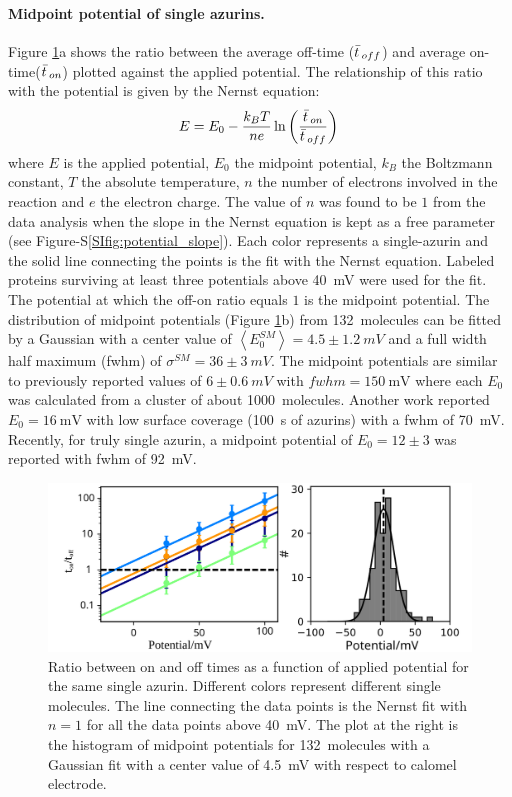 \paragraph*{Midpoint potential of single azurins.}
Figure \ref{fig:midpoint}a shows the ratio between the average off-time ($\bar{t}\,_{off}$) and average on-time($\bar{t}\,_{on}$) plotted against the applied potential.
The relationship of this ratio with the potential is given by the Nernst equation: 
\begin{equation}
	E = E_0 - \frac{k_BT}{n e}\ln\left(\frac{\bar{t}\,_{on}}{\bar{t}\,_{off}}\right)\,
	\label{eq:nernst}
\end{equation}
where $E$ is the applied potential, $E_0$ the midpoint potential, $k_B$ the Boltzmann constant, $T$ the absolute temperature, $n$ the number of electrons involved in the reaction and $e$ the electron charge.
The value of $n$ was found to be $1$ from the data analysis when the slope in the Nernst equation is kept as a free parameter (see Figure-S\ref{SIfig:potential_slope}).
Each color represents a single-azurin and the solid line connecting the points is the fit with the Nernst equation.
Labeled proteins surviving at least three potentials above \SI{40}{\mV} were used for the fit.
The potential at which the off-on ratio equals $1$ is the midpoint potential.
The distribution of midpoint potentials (Figure \ref{fig:midpoint}b) from \SI{132}{ molecules} can be fitted by a Gaussian with a center value of $\left<E_0^{SM}\right>=4.5 \pm 1.2~mV$ and a full width half maximum (fwhm) of $\sigma^{SM}=36 \pm 3~mV$. 
The midpoint potentials are similar to previously reported values of $6\pm0.6~mV$ with $fwhm=\SI{150}{\mV}$ where each $E_0$ was calculated from a cluster of about \SI{1000}{ molecules}.\cite{davis2006monitoring}
Another work reported $E_0 = \SI{16}{\mV}$ with low surface coverage (\SI{100}{\s} of azurins) with a fwhm of \SI{70}{\mV}.\cite{salverda2010fluorescent} 
Recently, for truly single azurin, a midpoint potential of $E_0=12\pm3$ was reported with fwhm of \SI{92}{\mV}.\cite{akkilic2014chemically-induced}\\
\begin{figure}
	\centering
	\includegraphics[width=\textwidth]{Figure_2_midpoint}
	\caption{Ratio between on and off times as a function of applied potential for the same single azurin.
	Different colors represent different single molecules.
	The line connecting the data points is the Nernst fit with $n=1$ for all the data points above \SI{40}{\mV}.
	The plot at the right is the histogram of midpoint potentials for \SI{132}{ molecules} with a Gaussian fit with a center value of \SI{4.5}{\mV} with respect to calomel electrode.}
	\label{fig:midpoint}
\end{figure}


